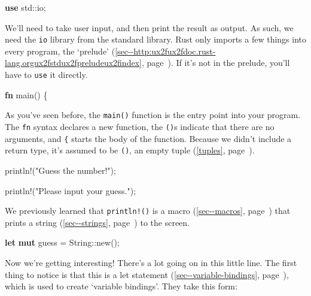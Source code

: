 \documentclass[a4paper,]{book}
\renewcommand*{\hyperref}[2][\ar]{%
  \def\ar{#2}%
  #2 (\autoref{#1}, page~\pageref{#1})}
\newenvironment{Shaded}{\begin{snugshade}}{\end{snugshade}}
\newcommand{\KeywordTok}[1]{\textcolor[rgb]{0.13,0.29,0.53}{\textbf{{#1}}}}
\newcommand{\StringTok}[1]{\textcolor[rgb]{0.31,0.60,0.02}{{#1}}}
\newcommand{\OtherTok}[1]{\textcolor[rgb]{0.56,0.35,0.01}{{#1}}}
\newcommand{\NormalTok}[1]{{#1}}
\begin{document}
\begin{Shaded}
\begin{Highlighting}[]
\KeywordTok{use} \NormalTok{std::io;}
\end{Highlighting}
\end{Shaded}

We'll need to take user input, and then print the result as output. As
such, we need the \texttt{io} library from the standard library. Rust
only imports a few things into every program,
\hyperref[sec--http:ux2fux2fdoc.rust-lang.orgux2fstdux2fpreludeux2findex]{the
`prelude'}. If it's not in the prelude, you'll have to \texttt{use} it
directly.

\begin{Shaded}
\begin{Highlighting}[]
\KeywordTok{fn} \NormalTok{main() \{}
\end{Highlighting}
\end{Shaded}

As you've seen before, the \texttt{main()} function is the entry point
into your program. The \texttt{fn} syntax declares a new function, the
\texttt{()}s indicate that there are no arguments, and \texttt{\{}
starts the body of the function. Because we didn't include a return
type, it's assumed to be \texttt{()}, an empty \hyperref[tuples]{tuple}.

\begin{Shaded}
\begin{Highlighting}[]
    \OtherTok{println!}\NormalTok{(}\StringTok{"Guess the number!"}\NormalTok{);}

    \OtherTok{println!}\NormalTok{(}\StringTok{"Please input your guess."}\NormalTok{);}
\end{Highlighting}
\end{Shaded}

We previously learned that \texttt{println!()} is a
\hyperref[sec--macros]{macro} that prints a
\hyperref[sec--strings]{string} to the screen.

\begin{Shaded}
\begin{Highlighting}[]
    \KeywordTok{let} \KeywordTok{mut} \NormalTok{guess = String::new();}
\end{Highlighting}
\end{Shaded}

Now we're getting interesting! There's a lot going on in this little
line. The first thing to notice is that this is a
\hyperref[sec--variable-bindings]{let statement}, which is used to
create `variable bindings'. They take this form:
\end{document}
